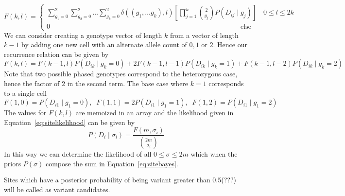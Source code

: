 \documentclass[../../main.tex]{subfiles}
\begin{document}
\begin{equation}
F(k,l) = \begin{cases} \sum_{g_1=0}^2\sum_{g_2=0}^2\dots\sum_{g_k=0}^2 \delta((g_1,\dots g_k),l)\left[\prod_{j=1}^{k}\binom{2}{g_j}P(D_{ij}\mid g_{j})\right] \quad 0\leq l \leq 2k \\
0 \qquad\qquad\qquad\qquad\qquad\qquad\qquad\qquad\qquad\qquad\qquad\qquad\qquad\qquad \text{else} \end{cases}
\end{equation}
We can consider creating a genotype vector of length $k$ from a vector of length $k-1$ by adding one new cell with an alternate allele count of $0,1$ or $2$. Hence our recurrence relation can be given by
\begin{equation}
F(k,l) = F(k-1,l)P(D_{ik}\mid g_k = 0) + 2F(k-1,l-1)P(D_{ik}\mid g_k = 1) + F(k-1,l-2)P(D_{ik}\mid g_k = 2)
\end{equation}
Note that two possible phased genotypes correspond to the heterozygous case, hence the factor of 2 in the second term. The base case where $k=1$ corresponds to a single cell
\begin{equation*}
F(1,0) = P(D_{i1}\mid g_1 = 0),\;\; F(1,1) = 2P(D_{i1}\mid g_1=1),\;\; F(1,2) = P(D_{i1}\mid g_1 = 2)
\end{equation*}
The values for $F(k,l)$ are memoized in an array and the likelihood given in Equation~\ref{eq:sitelikelihood} can be given by
\begin{equation}
P(D_i\mid \sigma_i)=\frac{F(m,\sigma_i)}{\binom{2m}{\sigma_i}}
\end{equation}
In this way we can determine the likelihood of all $0\leq \sigma\leq 2m$ which when the priors $P(\sigma)$ compose the sum in Equation~\eqref{eq:sitebayes}.

Sites which have a posterior probability of being variant greater than 0.5(???) will be called as variant candidates.
\end{document}
